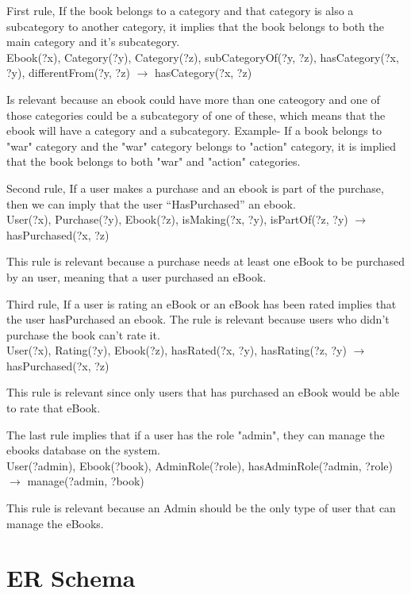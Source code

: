 \documentclass[a4paper,11pt]{article}
\begin{document}
First rule, If the book belongs to a category and that category is also a subcategory to another
category, it implies that the book belongs to both the main category and it's subcategory.\\

Ebook(?x), Category(?y), Category(?z), subCategoryOf(?y, ?z), hasCategory(?x, ?y), differentFrom(?y, ?z) $\rightarrow$ hasCategory(?x, ?z)

Is relevant because an ebook could have more than one cateogory and one of those categories could
be a subcategory of one of these, which means that the ebook will have a category and a subcategory.
Example- If a book belongs to "war" category and the "war" category belongs to "action" category,
it is implied that the book belongs to both "war" and "action" categories.

Second rule, If a user makes a purchase and an ebook is part of the purchase, then we can imply that
the user “HasPurchased” an ebook. \\

User(?x), Purchase(?y), Ebook(?z), isMaking(?x, ?y), isPartOf(?z, ?y) $\rightarrow$ hasPurchased(?x, ?z)

This rule is relevant because a purchase needs at least one eBook to be purchased by an user, meaning
that a user purchased an eBook.

Third rule, If a user is rating an eBook or an eBook has been rated implies that the user hasPurchased an ebook.
The rule is relevant because users who didn't purchase the book can't rate it.\\

User(?x), Rating(?y), Ebook(?z), hasRated(?x, ?y), hasRating(?z, ?y) $\rightarrow$ hasPurchased(?x, ?z)

This rule is relevant since only users that has purchased an eBook would be able to rate that eBook.

The last rule implies that if a user has the role "admin", they can manage the ebooks database on the system.\\

User(?admin), Ebook(?book), AdminRole(?role), hasAdminRole(?admin, ?role) $\rightarrow$ manage(?admin, ?book)

This rule is relevant because an Admin should be the only type of user that can manage the eBooks.

\section{ER Schema}
\end{document}
